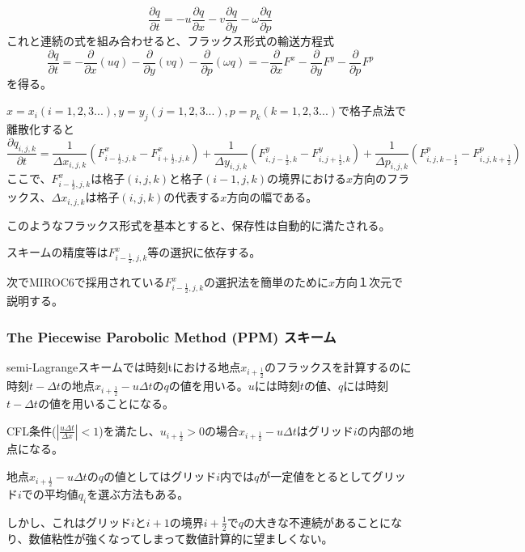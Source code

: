 \documentclass{jsbook}
\begin{document}
\begin{equation}
\frac{\partial q}{\partial t} = -u \frac{\partial q}{\partial x}-v \frac{\partial q}{\partial y}-\omega \frac{\partial q}{\partial p}
\end{equation}
これと連続の式を組み合わせると、フラックス形式の輸送方程式
\begin{equation}
  \frac{\partial q}{\partial t}=-\frac{\partial}{\partial x}(uq)-\frac{\partial}{\partial y}(vq)-\frac{\partial}{\partial p}(\omega q)
  =-\frac{\partial}{\partial x}F^{x}-\frac{\partial}{\partial y}F^{y}-\frac{\partial}{\partial p}F^{p}
\end{equation}
を得る。

$x=x_{i} (i=1,2,3...), y=y_{j} (j=1,2,3...), p=p_{k} (k=1,2,3...)$で格子点法で離散化すると
\begin{equation}
  \frac{\partial q_{i,j,k}}{\partial t}=\frac{1}{\Delta x_{i,j,k}}(F^{x}_{i-\frac{1}{2},j,k}-F^{x}_{i+\frac{1}{2},j,k})+\frac{1}{\Delta y_{i,j,k}}(F^{y}_{i,j-\frac{1}{2},k}-F^{y}_{i,j+\frac{1}{2},k})+\frac{1}{\Delta p_{i,j,k}}(F^{p}_{i,j,k-\frac{1}{2}}-F^{p}_{i,j,k+\frac{1}{2}})
\end{equation}
ここで、$F^{x}_{i-\frac{1}{2},j,k}$は格子$(i,j,k)$と格子$(i-1,j,k)$の境界における$x$方向のフラックス、$\Delta x_{i,j,k}$は格子$(i,j,k)$の代表する$x$方向の幅である。

このようなフラックス形式を基本とすると、保存性は自動的に満たされる。

スキームの精度等は$F^{x}_{i-\frac{1}{2},j,k}$等の選択に依存する。

次でMIROC6で採用されている$F^{x}_{i-\frac{1}{2},j,k}$の選択法を簡単のために$x$方向１次元で説明する。
\subsubsection{The Piecewise Parobolic Method (PPM) スキーム}
semi-Lagrangeスキームでは時刻tにおける地点$x_{i+\frac{1}{2}}$のフラックスを計算するのに時刻$t-\Delta t$の地点$x_{i+\frac{1}{2}}-u\Delta t$の$q$の値を用いる。$u$には時刻$t$の値、$q$には時刻$t-\Delta t$の値を用いることになる。

CFL条件($|\frac{u\Delta t}{\Delta x}|<1$)を満たし、$u_{i+\frac{1}{2}}>0$の場合$x_{i+\frac{1}{2}}-u\Delta t$はグリッド$i$の内部の地点になる。

地点$x_{i+\frac{1}{2}}-u\Delta t$の$q$の値としてはグリッド$i$内では$q$が一定値をとるとしてグリッド$i$での平均値$q_{i}$を選ぶ方法もある。

しかし、これはグリッド$i$と$i+1$の境界$i+\frac{1}{2}$で$q$の大きな不連続があることになり、数値粘性が強くなってしまって数値計算的に望ましくない。
\end{document}

